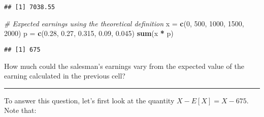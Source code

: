 \documentclass[
]{article}
\newenvironment{Shaded}{\begin{snugshade}}{\end{snugshade}}
\newcommand{\CommentTok}[1]{\textcolor[rgb]{0.56,0.35,0.01}{\textit{#1}}}
\newcommand{\DecValTok}[1]{\textcolor[rgb]{0.00,0.00,0.81}{#1}}
\newcommand{\FloatTok}[1]{\textcolor[rgb]{0.00,0.00,0.81}{#1}}
\newcommand{\FunctionTok}[1]{\textcolor[rgb]{0.13,0.29,0.53}{\textbf{#1}}}
\newcommand{\NormalTok}[1]{#1}
\newcommand{\OtherTok}[1]{\textcolor[rgb]{0.56,0.35,0.01}{#1}}
\newcommand{\SpecialCharTok}[1]{\textcolor[rgb]{0.81,0.36,0.00}{\textbf{#1}}}
\begin{document}
\begin{verbatim}
## [1] 7038.55
\end{verbatim}

\begin{Shaded}
\begin{Highlighting}[]
\CommentTok{\# Expected earnings using the theoretical definition}
\NormalTok{x }\OtherTok{=} \FunctionTok{c}\NormalTok{(}\DecValTok{0}\NormalTok{, }\DecValTok{500}\NormalTok{, }\DecValTok{1000}\NormalTok{, }\DecValTok{1500}\NormalTok{, }\DecValTok{2000}\NormalTok{)}
\NormalTok{p }\OtherTok{=} \FunctionTok{c}\NormalTok{(}\FloatTok{0.28}\NormalTok{, }\FloatTok{0.27}\NormalTok{, }\FloatTok{0.315}\NormalTok{, }\FloatTok{0.09}\NormalTok{, }\FloatTok{0.045}\NormalTok{)}
\FunctionTok{sum}\NormalTok{(x }\SpecialCharTok{*}\NormalTok{ p)}
\end{Highlighting}
\end{Shaded}

\begin{verbatim}
## [1] 675
\end{verbatim}

How much could the salesman's earnings vary from the expected value of
the earning calculated in the previous cell?

\begin{center}\rule{0.5\linewidth}{0.5pt}\end{center}

To answer this question, let's first look at the quantity
\(X-E[X] = X-675.\) Note that:
\end{document}
